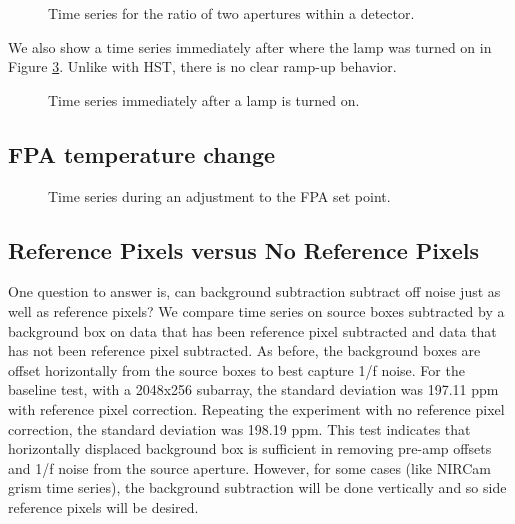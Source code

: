 \documentclass{aastex62}
\begin{document}
{\begin{figure}
{}
{}
\caption{Time series for the ratio of two apertures within a detector.}\label{fig:allanVarianceWithinDetector}
\end{figure}

We also show a time series immediately after where the lamp was turned on in Figure \ref{fig:indTSeriesAfterLamp}.
Unlike with HST, there is no clear ramp-up behavior.

\begin{figure}
{}
\caption{Time series immediately after a lamp is turned on.}\label{fig:indTSeriesAfterLamp}
\end{figure}


\clearpage
\subsection{FPA temperature change}
\begin{figure}
{}
\caption{Time series during an adjustment to the FPA set point.}\label{fig:indTSeriesAfterLamp}
\end{figure}


\clearpage
\subsection{Reference Pixels versus No Reference Pixels}
One question to answer is, can background subtraction subtract off noise just as well as reference pixels?
We compare time series on source boxes subtracted by a background box on data that has been reference pixel subtracted and data that has not been reference pixel subtracted.
As before, the background boxes are offset horizontally from the source boxes to best capture 1/f noise.
For the baseline test, with a 2048x256 subarray, the standard deviation was 197.11 ppm with reference pixel correction.
Repeating the experiment with no reference pixel correction, the standard deviation was 198.19 ppm.
This test indicates that horizontally displaced background box is sufficient in removing pre-amp offsets and 1/f noise from the source aperture.
However, for some cases (like NIRCam grism time series), the background subtraction will be done vertically and so side reference pixels will be desired.

}
\end{document}
